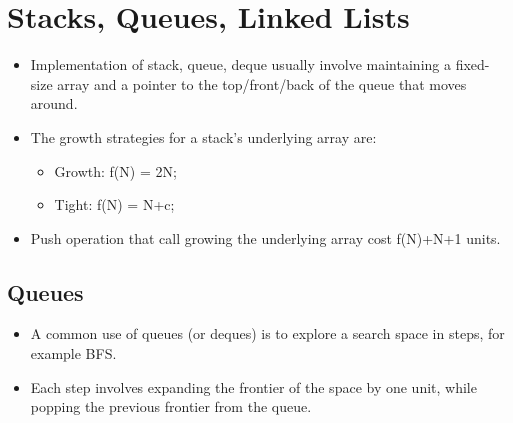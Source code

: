 \documentclass{report}
\begin{document}
\section{Stacks, Queues, Linked Lists}
\begin{itemize}
\item Implementation of stack, queue, deque usually involve maintaining a
fixed-size array and a pointer to the top/front/back of the queue that moves around.
\item The growth strategies for a stack's underlying array are:
\begin{itemize}
    \item Growth: f(N) = 2N;
    \item Tight: f(N) = N+c;
\end{itemize}
\item Push operation that call growing the underlying array cost f(N)+N+1 units.
\end{itemize}
\subsection{Queues}
\begin{itemize}
\item A common use of queues (or deques) is to explore a search space in steps, for example BFS.
\item Each step involves expanding the frontier of the space by one unit, while popping the previous frontier from the queue.
\end{itemize}
\end{document}
